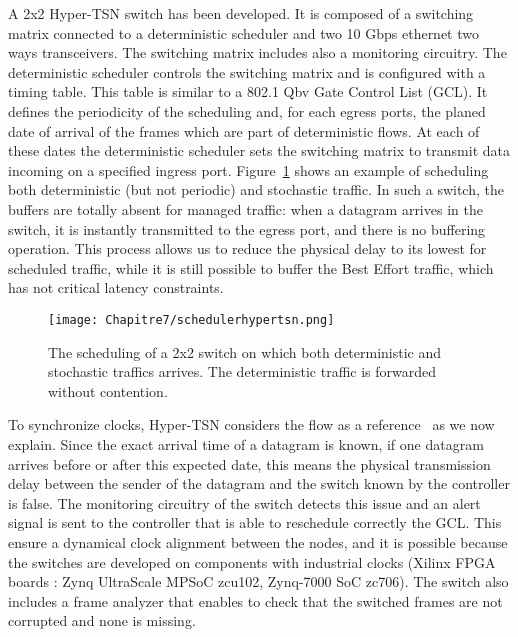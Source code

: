 A 2x2 Hyper-TSN switch has been developed. It is composed of a switching matrix connected to a deterministic scheduler and two 10 Gbps ethernet two ways transceivers. The switching matrix includes also a monitoring circuitry. The deterministic scheduler controls the switching matrix and is configured with a timing table. This table is similar to a 802.1 Qbv Gate Control List (GCL). It defines the periodicity of the scheduling and, for each egress ports, the planed date of arrival of the frames which are part of deterministic flows. At each of these dates the deterministic scheduler sets the switching matrix to transmit data incoming on a specified ingress port. Figure~\ref{fig:schedulehtsn} shows an example of scheduling both deterministic (but not periodic) and stochastic traffic.
 In such a switch, the buffers are totally absent for managed traffic: when a datagram arrives in the switch, it is instantly transmitted to the egress port, and there is no buffering operation. This process allows us to reduce the physical delay to its lowest for scheduled traffic, while it is still possible to buffer the Best Effort traffic, which has not critical latency constraints.
\begin{center}

\begin{figure}[h]
  \centering
\texttt{[image: Chapitre7/schedulerhypertsn.png]}
\caption{ The scheduling of a 2x2 switch on which both deterministic and stochastic traffics arrives. The deterministic traffic is forwarded without contention.}
\label{fig:schedulehtsn}
\end{figure}
\end{center}

To synchronize clocks, Hyper-TSN considers the flow as a reference~\cite{leclerc2020optical} as we now explain. Since the exact arrival time of a datagram is known, if one datagram arrives before or after this expected date, this means the physical transmission delay between the sender of the datagram and the switch known by the controller is false. The monitoring circuitry of the switch detects this issue and an alert signal is sent to the controller that is able to reschedule correctly the GCL.
This ensure a dynamical clock alignment between the nodes, and it is possible because the switches are developed on components with industrial clocks (Xilinx FPGA boards : Zynq UltraScale MPSoC zcu102, Zynq-7000 SoC zc706). 
The switch also includes a frame analyzer that enables to check that the switched frames are not corrupted and none is missing.

